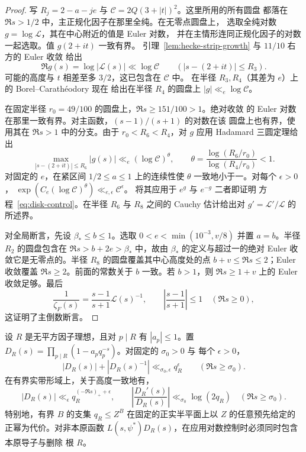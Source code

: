 \begin{proof}
写 $R_j=2-a-je$ 与 $\mathcal C=2Q(3+|t|)^2$。这里所用的所有圆盘
都落在 $\Re s>1/2$ 中，主正规化因子在那里全纯。在无零点圆盘上，
选取全纯对数 $g=\log\mathcal L$，其在中心附近的值是 Euler 对数，
并在主情形连同正规化因子的对数一起选取。值 $g(2+it)$ 一致有界。
引理~\ref{lem:hecke-strip-growth} 与 $11/10$ 右方的 Euler 收敛
给出
\[
 \Re g(s)=\log|\mathcal L(s)|\ll\log\mathcal C
       \qquad(|s-(2+it)|\le R_3).
\]
可能的高度与 $t$ 相差至多 $3/2$，这已包含在 $\mathcal C$ 中。
在半径 $R_3,R_4$（其差为 $e$）上的 Borel--Carath\'eodory 现在
给出在半径 $R_4$ 的圆盘上 $|g|\ll_e\log\mathcal C$。

在固定半径 $r_0=49/100$ 的圆盘上，$\Re s\ge151/100>1$。绝对收敛
的 Euler 对数在那里一致有界。对主函数，$(s-1)/(s+1)$ 的对数在该
圆盘上也有界，使用其在 $\Re s>1$ 中的分支。由于
$r_0<R_6<R_4$，对 $g$ 应用 Hadamard 三圆定理给出
\[
 \max_{|s-(2+it)|\le R_6}|g(s)|
 \ll_e(\log\mathcal C)^\theta,
 \qquad
 \theta=\frac{\log(R_6/r_0)}{\log(R_4/r_0)}<1.
\]
对固定的 $e$，在紧区间 $1/2\le a\le1$ 上的连续性使 $\theta$
一致地小于一。对每个 $\epsilon>0$，
$\exp(C_e(\log\mathcal C)^\theta)\ll_{e,\epsilon}\mathcal C^\epsilon$。
将其应用于 $e^g$ 与 $e^{-g}$ 二者即证明
方程~\eqref{eq:disk-control}。在半径 $R_6$ 与 $R_8$ 之间的 Cauchy
估计给出对 $g'=\mathcal L'/\mathcal L$ 的所述界。

对全局断言，先设 $\beta_*\le b\le1$。选取
$0<e<\min(10^{-3},v/8)$ 并置 $a=b$。半径 $R_2$ 的圆盘包含在
$\Re s>b+2e>\beta_*$ 中，故由 $\beta_*$ 的定义与超过一的绝对
Euler 收敛它是无零点的。半径 $R_8$ 的圆盘覆盖其中心高度处的点
$b+v\le\Re s\le2$；Euler 收敛覆盖 $\Re s\ge2$。前面的常数关于
$b$ 一致。若 $b>1$，则 $\Re s\ge1+v$ 上的 Euler 收敛足够。最后
\[
 \frac1{\zeta_F(s)}=\frac{s-1}{s+1}\mathcal L(s)^{-1},
 \qquad \left|\frac{s-1}{s+1}\right|\le1\quad(\Re s\ge0),
\]
这证明了主倒数断言。
\end{proof}

\begin{lemma}\label{lem:deleted-euler-factors}
设 $R$ 是无平方因子理想，且对 $p\mid R$ 有 $|a_p|\le1$。置
$D_R(s)=\prod_{p\mid R}(1-a_pq_p^{-s})$。对固定的 $\sigma_0>0$ 与
每个 $\epsilon>0$，
\[
 |D_R(s)|+|D_R(s)^{-1}|\ll_{\sigma_0,\epsilon}q_R^\epsilon
       \qquad(\Re s\ge\sigma_0).
\]
在有界实带形域上，关于高度一致地有，
\[
 |D_R(s)|\ll_\epsilon q_R^{(-\Re s)_++\epsilon},
 \qquad
 \left|\frac{D_R'(s)}{D_R(s)}\right|
 \ll_{\sigma_0}\log(2q_R)\quad(\Re s\ge\sigma_0).
\]
特别地，有界 $B$ 的支集 $q_R\le Z^B$ 在固定的正实半平面上以 $Z$
的任意预先给定的正幂为代价。对非本原函数
$L(s,\psi^*)D_R(s)$，在应用对数控制时必须同时包含本原导子与删除
根 $R$。
\end{lemma}

